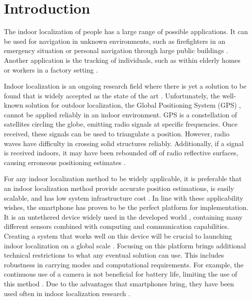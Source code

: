 
\chapter{Introduction} \label{chap:intro}

The indoor localization of people has a large range of possible applications. It can be used for navigation in unknown environments, such as firefighters in an emergency situation or personal navigation through large public buildings \cite{Correa2017, Jackermeier2018}. Another application is the tracking of individuals, such as within elderly homes or workers in a factory setting \cite{Correa2017}. \par

Indoor localization is an ongoing research field where there is yet a solution to be found that is widely accepted as the state of the art \cite{Davidson2017}. Unfortunately, the well-known solution for outdoor localization, the Global Positioning System (GPS) \cite{Jackermeier2018}, cannot be applied reliably in an indoor environment. GPS is a constellation of satellites circling the globe, emitting radio signals at specific frequencies. Once received, these signals can be used to triangulate a position. However, radio waves have difficulty in crossing solid structures reliably. Additionally, if a signal is received indoors, it may have been rebounded off of radio reflective surfaces, causing erroneous positioning estimates \cite{Jackermeier2018}. \par 

For any indoor localization method to be widely applicable, it is preferable that an indoor localization method provide accurate position estimations, is easily scalable, and has low system infrastructure cost \cite{Correa2017}.
In line with these applicability wishes, the smartphone has proven to be the perfect platform for implementation. It is an untethered device widely used in the developed world \cite{Correa2017}, containing many different sensors combined with computing and communication capabilities.
Creating a system that works well on this device will be crucial to launching indoor localization on a global scale \cite{Gu2019}. Focusing on this platform brings additional technical restrictions to what any eventual solution can use. This includes robustness in carrying modes and computational requirements.  For example, the continuous use of a camera is not beneficial for battery life, limiting the use of this method \cite{Yang2014, Solin2018a}. Due to the advantages that smartphones bring, they have been used often in indoor localization research \cite{Jackermeier2018,Correa2017,Yang2014, Qian2013}. \par 

